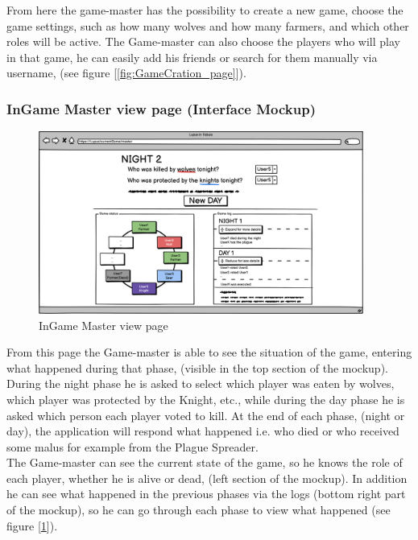 From here the game-master has the possibility to create a new game, choose the game settings, such as how many wolves and how many farmers, and which other roles will be active. The Game-master can also choose the players who will play in that game, he can easily add his friends or search for them manually via username, (see figure [\ref{fig:GameCration_page}]).

\subsubsection{InGame Master view page (Interface Mockup)}
\begin{figure}[htb] 
    \centering
    \includegraphics[height=6cm]{images/Page/Gamemaster.png}
    \caption{InGame Master view page}
    \label{fig:Gamemaster_page}
\end{figure}

From this page the Game-master is able to see the situation of the game, entering what happened during that phase, (visible in the top section of the mockup). During the night phase he is asked to select which player was eaten by wolves, which player was protected by the Knight, etc., while during the day phase he is asked which person each player voted to kill. At the end of each phase, (night or day), the application will respond what happened i.e. who died or who received some malus for example from the Plague Spreader.\\
The Game-master can see the current state of the game, so he knows the role of each player, whether he is alive or dead, (left section of the mockup). In addition he can see what happened in the previous phases via the logs (bottom right part of the mockup), so he can go through each phase to view what happened (see figure [\ref{fig:Gamemaster_page}]).


